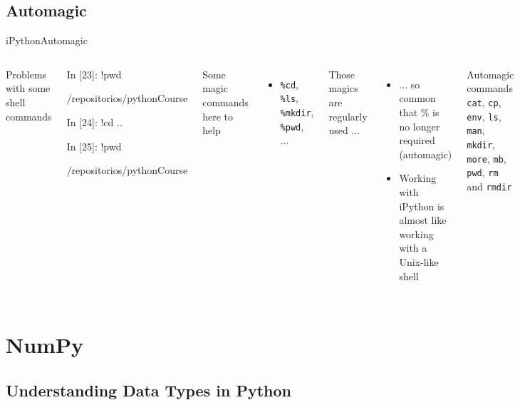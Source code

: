 \documentclass[10pt,compress]{beamer} %
\begin{document}
\subsection{Automagic}

\begin{frame}[fragile]{iPython}{Automagic}
	\begin{columns}
	Problems with some shell commands
	\begin{exampleblock}{}
In [23]: !pwd

/repositorios/pythonCourse


In [24]: !cd ..


In [25]: !pwd

/repositorios/pythonCourse
	\end{exampleblock}
	Some magic commands here to help
	\begin{itemize}
		\item \texttt{\%cd}, \texttt{\%ls}, \texttt{\%mkdir}, \texttt{\%pwd}, ...
	\end{itemize}

	Those magics are regularly used ...
	\begin{itemize}
		\item ... so common that \% is no longer required (automagic)
		\item Working with iPython is almost like working with a Unix-like shell
	\end{itemize}
	\footnotesize{
	\begin{block}{\footnotesize{Automagic commands}}
\texttt{cat}, \texttt{cp}, \texttt{env}, \texttt{ls}, \texttt{man}, \texttt{mkdir}, \texttt{more}, \texttt{mb}, \texttt{pwd}, \texttt{rm} and \texttt{rmdir}
	\end{block}
	}
	\end{columns}

\end{frame}

\section{NumPy}
\subsection{Understanding Data Types in Python}
\end{document}
